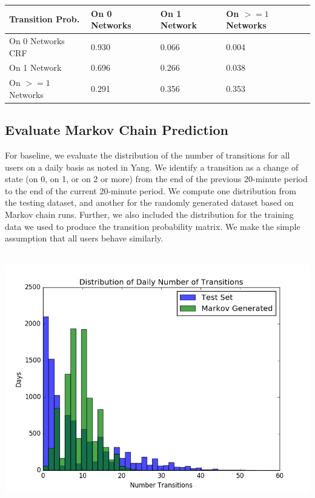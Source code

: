 \documentclass[]{article}
\newenvironment{Figure}
  {\par\medskip\noindent\minipage{\linewidth}}
  {\endminipage\par\medskip}
\begin{document}
\begin{center}
    \begin{tabular}{| l | l | l | l |}
    \hline
     Transition Prob.& On 0 Networks & On 1 Network & On $>=1$ Networks\\ 
    \hline
    On 0 Networks CRF& 0.930 &0.066 & 0.004\\ 
    On 1 Network& 0.696 &0.266 & 0.038\\ 
    On $>=1$ Networks & 0.291 & 0.356 & 0.353\\
    \hline
    \end{tabular}
\end{center}

\subsection{Evaluate Markov Chain Prediction}
For baseline, we evaluate the distribution of the number of transitions for all users on a daily basis as noted in Yang. We identify a transition as a change of state (on 0, on 1, or on 2 or more) from the end of the previous 20-minute period to the end of the current 20-minute period. We compute one distribution from the testing dataset, and another for the randomly generated dataset based on Markov chain runs. Further, we also included the distribution for the training data we used to produce the transition probability matrix. We make the simple assumption that all users behave similarly. 

\begin{Figure}
 \centering
 \includegraphics[height = 11cm, width =15cm]{markovGenTest.png}
\end{Figure}
\end{document}
